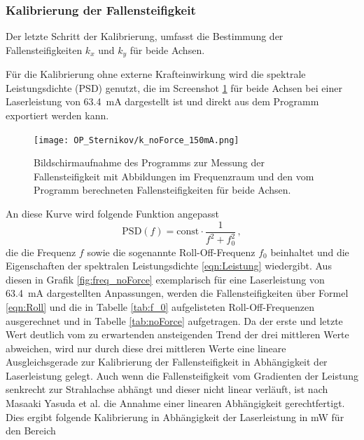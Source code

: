         \newpage
        \subsubsection{Kalibrierung der Fallensteifigkeit}
            Der letzte Schritt der Kalibrierung, umfasst die Bestimmung der Fallensteifigkeiten $k_x$ und $k_y$ für beide Achsen.
            
            Für die Kalibrierung ohne externe Krafteinwirkung wird die spektrale Leistungsdichte (PSD) genutzt, die im Screenshot \ref{fig:PSD} für beide Achsen bei einer Laserleistung von 
            \SI{63.4}{\milli\ampere} dargestellt ist und direkt aus dem Programm exportiert werden kann. 
            \begin{figure}[h]
            \centering
            \texttt{[image: OP\_Sternikov/k\_noForce\_150mA.png]}
            \caption{Bildschirmaufnahme des Programms zur Messung der Fallensteifigkeit mit Abbildungen im Frequenzraum und den vom Programm berechneten Fallensteifigkeiten für beide Achsen.}
            \label{fig:PSD}
            \end{figure}
            \FloatBarrier
            An diese Kurve wird folgende Funktion angepasst
            \begin{equation*}
                \text{PSD}(f) = \text{const} \cdot \frac{1}{f^2+f_0^2} \, ,
            \end{equation*}
            die die Frequenz $f$ sowie die sogenannte Roll-Off-Frequenz $f_0$ beinhaltet und die Eigenschaften der spektralen Leistungsdichte \ref{eqn:Leistung} wiedergibt. Aus diesen in Grafik 
            \ref{fig:freq_noForce} exemplarisch für eine Laserleistung von \SI{63.4}{\milli\ampere} dargestellten Anpassungen, werden die Fallensteifigkeiten über Formel \ref{eqn:Roll} und die in Tabelle
            \ref{tab:f_0} aufgelisteten Roll-Off-Frequenzen ausgerechnet und in Tabelle \ref{tab:noForce} aufgetragen. Da der erste und letzte Wert deutlich vom zu erwartenden ansteigenden Trend der drei 
            mittleren Werte abweichen, wird nur durch diese drei mittleren Werte eine lineare Ausgleichsgerade zur Kalibrierung der Fallensteifigkeit in Abhängigkeit der Laserleistung gelegt. Auch wenn 
            die Fallensteifigkeit vom Gradienten der Leistung senkrecht zur Strahlachse abhängt und dieser nicht linear verläuft, ist nach Masaaki Yasuda et al. \cite{yasuda_direct_2017} die Annahme einer
            linearen Abhängigkeit gerechtfertigt.  
            Dies ergibt folgende Kalibrierung in Abhängigkeit der Laserleistung in \si{\milli\watt} für den Bereich 
